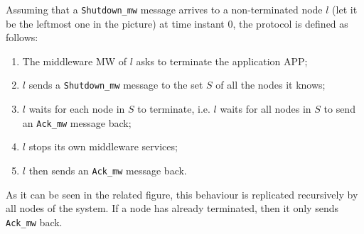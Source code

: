 Assuming that a \texttt{Shutdown\_mw} message arrives to a non-terminated node
$l$ (let it be the leftmost one in the picture) at time instant 0, the protocol
is defined as follows:

\begin{enumerate}
  \item The middleware MW of $l$ asks to terminate the application APP;
  \item $l$ sends a \texttt{Shutdown\_mw} message to the set
    $S$ of all the nodes it knows;
  \item $l$ waits for each node in $S$ to terminate, i.e. $l$ waits for all
    nodes in $S$ to send an \texttt{Ack\_mw} message back;
  \item $l$ stops its own middleware services;
  \item $l$ then sends an \texttt{Ack\_mw} message back.
\end{enumerate}

As it can be seen in the related figure, this behaviour is replicated
recursively by all nodes of the system. If a node has already terminated, then
it only sends \texttt{Ack\_mw} back.
